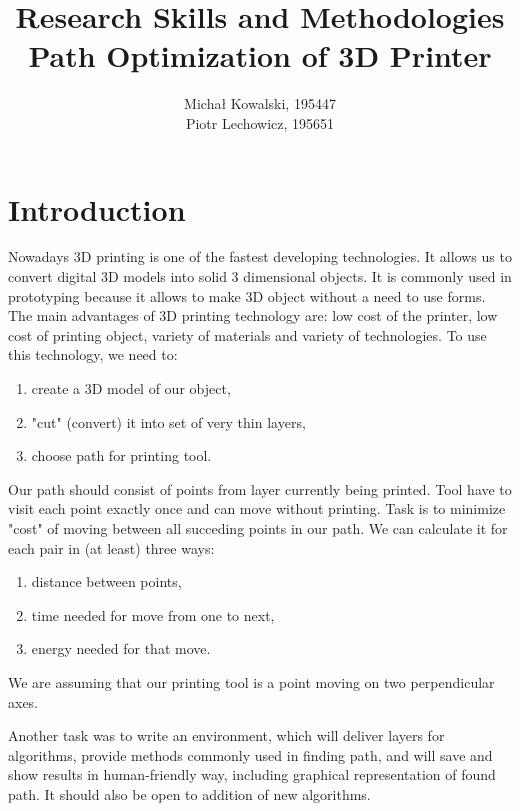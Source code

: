 \documentclass[titlepage]{article}
\title{Research Skills and Methodologies\\Path Optimization of 3D Printer}
\author{Michał Kowalski, 195447\\Piotr Lechowicz, 195651}
\date{}
\begin{document}
\maketitle

\tableofcontents
\newpage

\section{Introduction}
Nowadays 3D printing is one of the fastest developing technologies. It allows us to convert digital 3D models into solid 3 dimensional objects. It is commonly used in prototyping because it allows to make 3D object without a need to use forms. The main advantages of 3D printing technology are: low cost of the printer, low cost of printing object, variety of materials and variety of technologies.
To use this technology, we need to:
\begin{enumerate}
\item create a 3D model of our object,
\item "cut" (convert) it into set of very thin layers,
\item choose path for printing tool.
\end{enumerate}
Our path should consist of points from layer currently being printed. Tool have to visit each point exactly once and can move without printing. Task is to minimize "cost" of moving between all succeding points in our path. We can calculate it for each pair in (at least) three ways:
\begin{enumerate}
\item distance between points,
\item time needed for move from one to next,
\item energy needed for that move.
\end{enumerate}
We are assuming that our printing tool is a point moving on two perpendicular axes.

Another task was to write an environment, which will deliver layers for algorithms, provide methods commonly used in finding path, and will save and show results in human-friendly way, including graphical representation of found path. It should also be open to addition of new algorithms.

\pagebreak
\end{document}
